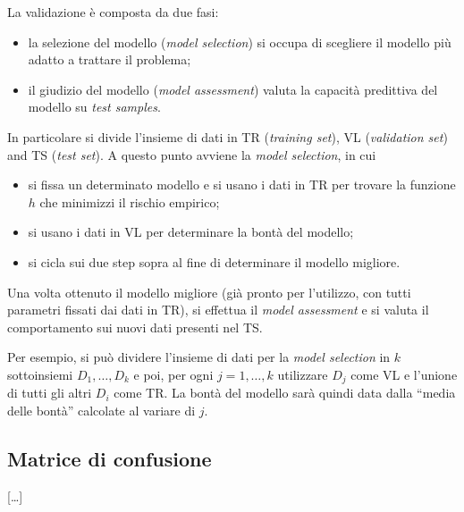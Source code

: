 La validazione è composta da due fasi:
\begin{itemize}
\item la selezione del modello (\emph{model selection}) si occupa di scegliere il modello più adatto a trattare il problema;
\item il giudizio del modello (\emph{model assessment}) valuta la capacità predittiva del modello su \emph{test samples}.
\end{itemize}
In particolare si divide l'insieme di dati in TR (\emph{training set}), VL (\emph{validation set}) and TS (\emph{test set}). A questo punto avviene la \emph{model selection}, in cui
\begin{itemize}
\item si fissa un determinato modello e si usano i dati in TR per trovare la funzione $h$ che minimizzi il rischio empirico;
\item si usano i dati in VL per determinare la bontà del modello;
\item si cicla sui due step sopra al fine di determinare il modello migliore.
\end{itemize}
Una volta ottenuto il modello migliore (già pronto per l'utilizzo, con tutti parametri fissati dai dati in TR), si effettua il \emph{model assessment} e si valuta il comportamento sui nuovi dati presenti nel TS.

\begin{example}
Per esempio, si può dividere l'insieme di dati per la \emph{model selection} in $k$ sottoinsiemi $D_1,\dots,D_k$ e poi, per ogni $j=1,\dots,k$ utilizzare $D_j$ come VL e l'unione di tutti gli altri $D_i$ come TR. La bontà del modello sarà quindi data dalla ``media delle bontà'' calcolate al variare di $j$.
\end{example}

\subsection{Matrice di confusione}

[\dots]
